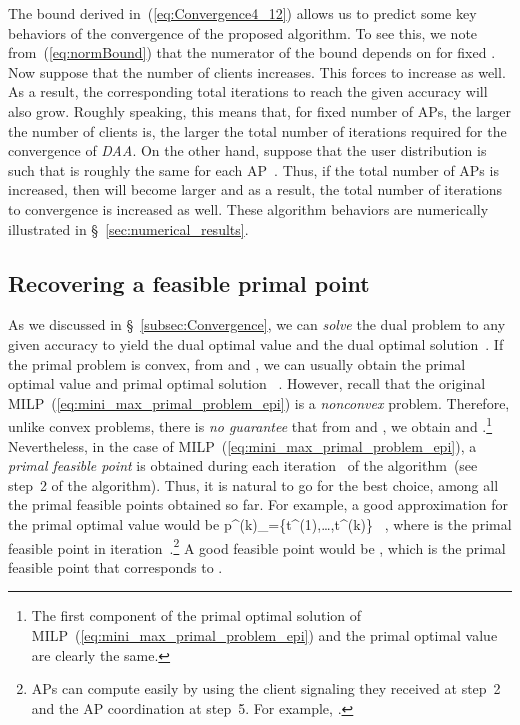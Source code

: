\documentclass[journal, 10pt, twocolumn]{IEEEtran}
\newcommand{\be}{}
\begin{document}
The bound derived in~(\ref{eq:Convergence4_12}) allows us to predict some key behaviors of the convergence of the proposed algorithm. To see this, we note from~(\ref{eq:normBound}) that the numerator of the bound depends on  for fixed . Now suppose that the number of clients increases. This forces  to increase as well. As a result, the corresponding total iterations to reach the given accuracy  will also grow. Roughly speaking, this means that, for fixed number of APs, the larger the number of clients is, the larger the total number of iterations required for the convergence of \emph{DAA}. On the other hand, suppose that the user distribution is such that  is roughly the same for each AP~. Thus, if the total number of APs is increased, then  will become larger and as a result, the total number of iterations to convergence is increased as well. These algorithm behaviors are numerically illustrated in \S~\ref{sec:numerical_results}.

\vspace{-3mm}
\subsection{Recovering a feasible primal point}\label{subsec:RecoverPrimal}
As we discussed in \S~\ref{subsec:Convergence}, we can \emph{solve} the dual problem to any given accuracy to yield the dual optimal value  and the dual optimal solution~. If the primal problem is convex, from  and , we can usually obtain the primal optimal value  and primal optimal solution ~\cite[\S~5.5.5]{Boyd-Vandenberghe-04}. However, recall that the original MILP~(\ref{eq:mini_max_primal_problem_epi}) is a \emph{nonconvex} problem. Therefore, unlike convex problems, there is \emph{no guarantee} that from  and , we obtain  and .\footnote{The first component  of the primal optimal solution of MILP~(\ref{eq:mini_max_primal_problem_epi}) and the primal optimal value  are clearly the same.} Nevertheless, in the case of MILP~(\ref{eq:mini_max_primal_problem_epi}), a \emph{primal feasible point} is obtained during each iteration~ of the algorithm~(see step~2 of the algorithm). Thus, it is natural to go for the best choice, among all the primal feasible points obtained so far. For example, a good approximation for the primal optimal value would be
\be\label{eq:best_primal_objective_afrer_k_itr}
p^{(k)}_{}=\min\{t^{(1)},\ldots,t^{(k)}\} \ ,
\ee
where  is the primal feasible point in iteration~.\footnote{APs can compute  easily by using the client signaling they received at step~2 and the AP coordination at step~5. For example, .}
A good feasible point would be , which is the primal feasible point that corresponds to .
\end{document}
